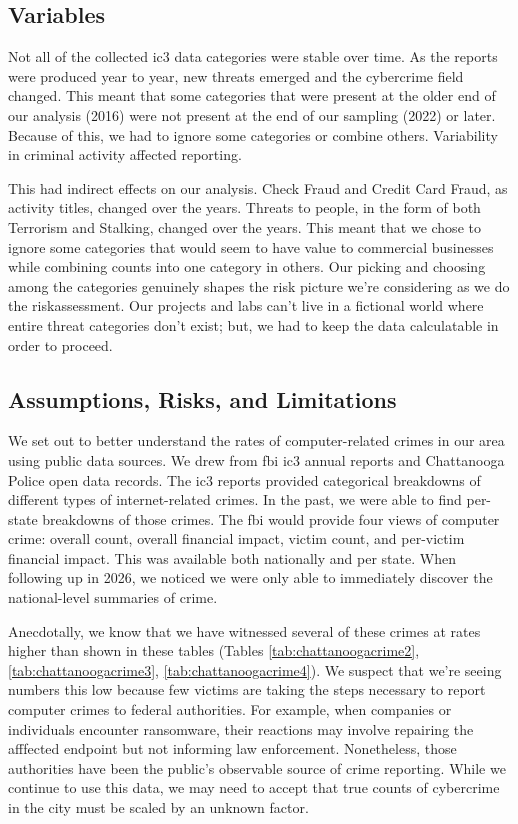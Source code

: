 \subsection{Variables}
Not all of the collected \gls{ic3} data categories were stable over time.  As the reports were produced year to year, new threats emerged and the  \gls{cybercrime} field changed.  This meant that some categories that were present at the older end of our analysis (2016) were not present at the end of our sampling (2022) or later.  Because of this, we had to ignore some categories or combine others.  Variability in criminal activity affected reporting.

This had indirect effects on our analysis.  Check Fraud and Credit Card Fraud, as activity titles, changed over the years.  Threats to people, in the form of both Terrorism and Stalking, changed over the years.  This meant that we chose to ignore some categories that would seem to have value to commercial businesses while combining counts into one category in others.  Our picking and choosing among the categories genuinely shapes the risk picture we're considering as we do the \gls{riskassessment}.  Our projects and labs can't live in a fictional world where entire \gls{threat} categories don't exist; but, we had to keep the data calculatable in order to proceed.

\subsection{Assumptions, Risks, and Limitations}
We set out to better understand the rates of computer-related crimes in our area using public data sources.  We drew from \gls{fbi} \gls{ic3} annual reports and Chattanooga Police open data records.  The \gls{ic3} reports provided categorical breakdowns of different types of internet-related crimes.  In the past, we were able to find per-state breakdowns of those crimes.  The \gls{fbi} would provide four views of computer crime:  overall count, overall financial impact, victim count, and per-victim financial impact.  This was available both nationally and per state.  When following up in 2026, we noticed we were only able to immediately discover the national-level summaries of crime.

Anecdotally, we know that we have witnessed several of these crimes at rates higher than shown in these tables (Tables \ref{tab:chattanoogacrime2}, \ref{tab:chattanoogacrime3}, \ref{tab:chattanoogacrime4}).  We suspect that we're seeing numbers this low because few victims are taking the steps necessary to report computer crimes to federal authorities.  For example, when companies or individuals encounter \gls{ransomware}, their reactions may involve repairing the afffected endpoint but not informing law enforcement.  Nonetheless, those authorities have been the public's observable source of crime reporting.  While we continue to use this data, we may need to accept that true counts of  \gls{cybercrime} in the city must be scaled by an unknown factor.

